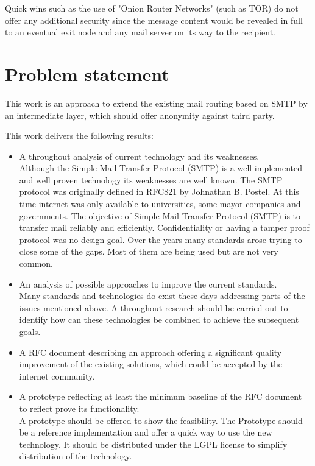\documentclass[11pt,a4paper]{book}
\begin{document}
Quick wins such as the use of "Onion Router Networks" (such as TOR) do not offer any additional security since the message content would be revealed in full to an eventual exit node and any mail server on its way to the recipient.

\section{Problem statement}
This work is an approach to extend the existing mail routing based on SMTP by an intermediate layer, which should offer anonymity against third party.\par

This work delivers the following results:

\begin{itemize}
  \item A throughout analysis of current technology and its weaknesses.\\
	      Although the Simple Mail Transfer Protocol (SMTP) is a well-implemented and well proven technology its weaknesses are well known. The SMTP protocol was originally defined in RFC821\cite{RFC821} by Johnathan B. Postel. At this time internet was only available to universities, some mayor companies and governments. The objective of Simple Mail Transfer Protocol (SMTP) is to transfer mail reliably and efficiently\cite[p.~1]{RFC821}. Confidentiality or having a tamper proof protocol was no design goal. Over the years many standards arose trying to close some of the gaps. Most of them are being used but are not very common. 
	\item An analysis of possible approaches to improve the current standards.\\
	      Many standards and technologies do exist these days addressing parts of the issues mentioned above. A throughout research should be carried out to identify how can these technologies be combined to achieve the subsequent goals.
	\item A RFC document describing an approach offering a significant quality improvement of the existing solutions, which could be accepted by the internet community.
	\item A prototype reflecting at least the minimum baseline of the RFC document to reflect prove its functionality.\\
	      A prototype should be offered to show the feasibility. The Prototype should be a reference implementation and offer a quick way to use the new technology. It should be distributed under the LGPL license to simplify distribution of the technology. 
\end{itemize}
\end{document}
